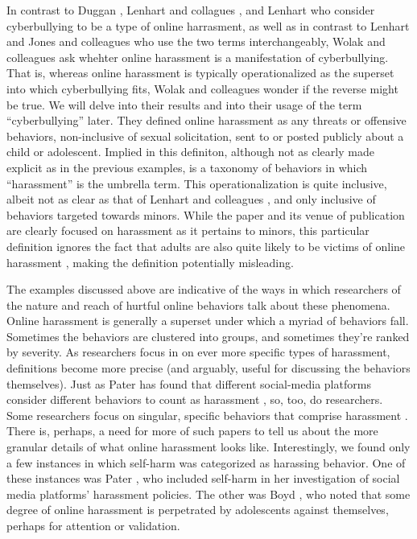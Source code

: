 \documentclass{sigchi}
\begin{document}
In contrast to Duggan \cite{Duggan2014Online}, Lenhart and collagues \cite{Lenhart2016Online}, and Lenhart \cite{Lenhart2010Cyberbullying} who consider cyberbullying to be a type of online harrasment, as well as in contrast to Lenhart \cite{Lenhart2007Cyberbullying} and Jones and colleagues \cite{Jones2013Online} who use the two terms interchangeably, Wolak and colleagues \cite{Wolak2007Does} ask whehter online harassment is a manifestation of cyberbullying.  That is, whereas online harassment is typically operationalized as the superset into which cyberbullying fits, Wolak and colleagues wonder if the reverse might be true.  We will delve into their results and into their usage of the term ``cyberbullying'' later.  They defined online harassment as any threats or offensive behaviors, non-inclusive of sexual solicitation, sent to or posted publicly about a child or adolescent.  Implied in this definiton, although not as clearly made explicit as in the previous examples, is a taxonomy of behaviors in which ``harassment'' is the umbrella term.  This operationalization is quite inclusive, albeit not as clear as that of Lenhart and colleagues \cite{Lenhart2016Online}, and only inclusive of behaviors targeted towards minors.  While the paper and its venue of publication are clearly focused on harassment as it pertains to minors, this particular definition ignores the fact that adults are also quite likely to be victims of online harassment \cite{Duggan2014Online,Lenhart2016Online}, making the definition potentially misleading.

The examples discussed above are indicative of the ways in which researchers of the nature and reach of hurtful online behaviors talk about these phenomena.  Online harassment is generally a superset under which a myriad of behaviors fall.  Sometimes the behaviors are clustered into groups, and sometimes they're ranked by severity.  As researchers focus in on ever more specific types of harassment, definitions become more precise (and arguably, useful for discussing the behaviors themselves).  Just as Pater has found that different social-media platforms consider different behaviors to count as harassment \cite{Pater2016Characterizations}, so, too, do researchers.  Some researchers focus on singular, specific behaviors that comprise harassment \cite{Moor2010Flaming}.  There is, perhaps, a need for more of such papers to tell us about the more granular details of what online harassment looks like.  Interestingly, we found only a few instances in which self-harm was categorized as harassing behavior.  One of these instances was Pater \cite{Pater2016Characterizations}, who included self-harm in her investigation of social media platforms' harassment policies.  The other was Boyd \cite{Boyd2014Bullying}, who noted that some degree of online harassment is perpetrated by adolescents against themselves, perhaps for attention or validation.
\end{document}
